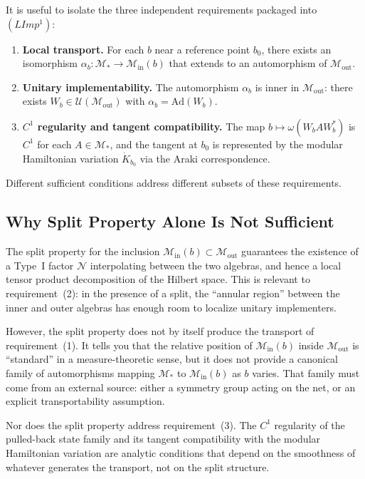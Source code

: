 \documentclass[12pt]{article}
\theoremstyle{definition}
\theoremstyle{remark}
\begin{document}
It is useful to isolate the three independent requirements packaged into $(LImp^1)$:

\begin{enumerate}
\item \textbf{Local transport.} For each $b$ near a reference point $b_0$, there exists an isomorphism $\alpha_b\colon \mathcal{M}_* \to \mathcal{M}_{\mathrm{in}}(b)$ that extends to an automorphism of $\mathcal{M}_{\mathrm{out}}$.
\item \textbf{Unitary implementability.} The automorphism $\alpha_b$ is inner in $\mathcal{M}_{\mathrm{out}}$: there exists $W_b \in \mathcal{U}(\mathcal{M}_{\mathrm{out}})$ with $\alpha_b = \mathrm{Ad}(W_b)$.
\item \textbf{$C^1$ regularity and tangent compatibility.} The map $b \mapsto \omega(W_b A W_b^*)$ is $C^1$ for each $A \in \mathcal{M}_*$, and the tangent at $b_0$ is represented by the modular Hamiltonian variation $\dot{K}_{b_0}$ via the Araki correspondence.
\end{enumerate}

Different sufficient conditions address different subsets of these requirements.

\subsection{Why Split Property Alone Is Not Sufficient}\label{why-split-alone-insufficient}

The split property for the inclusion $\mathcal{M}_{\mathrm{in}}(b) \subset \mathcal{M}_{\mathrm{out}}$ guarantees the existence of a Type~I factor $\mathcal{N}$ interpolating between the two algebras, and hence a local tensor product decomposition of the Hilbert space. This is relevant to requirement~(2): in the presence of a split, the ``annular region'' between the inner and outer algebras has enough room to localize unitary implementers.

However, the split property does not by itself produce the transport of requirement~(1). It tells you that the relative position of $\mathcal{M}_{\mathrm{in}}(b)$ inside $\mathcal{M}_{\mathrm{out}}$ is ``standard'' in a measure-theoretic sense, but it does not provide a canonical family of automorphisms mapping $\mathcal{M}_*$ to $\mathcal{M}_{\mathrm{in}}(b)$ as $b$ varies. That family must come from an external source: either a symmetry group acting on the net, or an explicit transportability assumption.

Nor does the split property address requirement~(3). The $C^1$ regularity of the pulled-back state family and its tangent compatibility with the modular Hamiltonian variation are analytic conditions that depend on the smoothness of whatever generates the transport, not on the split structure.
\end{document}
